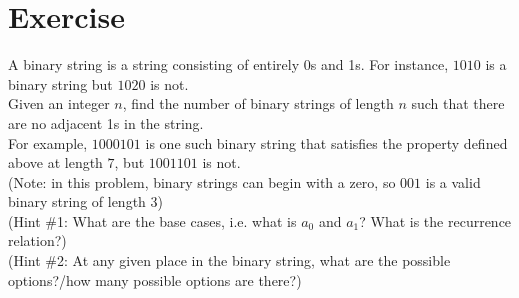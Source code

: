 \documentclass{article}
\begin{document}
       
	\section{Exercise}
    	A binary string is a string consisting of entirely 0s and 1s.
        For instance, $1010$ is a binary string but $1020$ is not. \\
        Given an integer $n$, find the number of binary strings of length $n$ such that there are no adjacent 1s in the string.\\
        
        For example, $1000101$ is one such binary string that satisfies the property defined above at length $7$, but $1001101$ is not.\\
        
        (Note: in this problem, binary strings can begin with a zero, so $001$ is a valid binary string of length 3) \\
        (Hint \#1: What are the base cases, i.e. what is $a_0$ and $a_1$? What is the recurrence relation?)\\
        (Hint \#2: At any given place in the binary string, what are the possible options?/how many possible options are there?)
\end{document}

